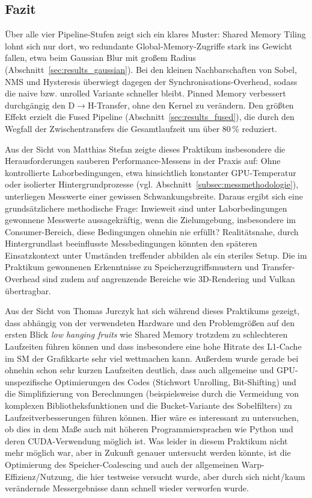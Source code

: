 \subsection{Fazit}
\label{subsec:fazit}

Über alle vier Pipeline-Stufen zeigt sich ein klares Muster: Shared Memory
Tiling lohnt sich nur dort, wo redundante Global-Memory-Zugriffe stark ins
Gewicht fallen, etwa beim Gaussian Blur mit großem Radius
(Abschnitt~\ref{sec:results_gaussian}). Bei den kleinen Nachbarschaften von
Sobel, NMS und Hysteresis überwiegt dagegen der Synchronisations-Overhead,
sodass die naive bzw. unrolled Variante schneller bleibt. Pinned Memory
verbessert durchgängig den D$\to$H-Transfer, ohne den Kernel zu verändern.
Den größten Effekt erzielt die Fused Pipeline
(Abschnitt~\ref{sec:results_fused}), die durch den Wegfall der
Zwischentransfers die Gesamtlaufzeit um über 80\,\% reduziert.

Aus der Sicht von Matthias Stefan zeigte dieses Praktikum insbesondere die
Herausforderungen sauberen Performance-Messens in der Praxis auf: Ohne
kontrollierte Laborbedingungen, etwa hinsichtlich konstanter GPU-Temperatur
oder isolierter Hintergrundprozesse (vgl.
Abschnitt~\ref{subsec:messmethodologie}), unterliegen Messwerte einer gewissen
Schwankungsbreite. Daraus ergibt sich eine grundsätzlichere methodische
Frage: Inwieweit sind unter Laborbedingungen gewonnene Messwerte
aussagekräftig, wenn die Zielumgebung, insbesondere im Consumer-Bereich,
diese Bedingungen ohnehin nie erfüllt? Realitätsnahe, durch
Hintergrundlast beeinflusste Messbedingungen könnten den späteren
Einsatzkontext unter Umständen treffender abbilden als ein steriles
Setup. Die im Praktikum gewonnenen Erkenntnisse zu Speicherzugriffsmustern
und Transfer-Overhead sind zudem auf angrenzende Bereiche wie
3D-Rendering und Vulkan übertragbar.

Aus der Sicht von Thomas Jurczyk hat sich während dieses Praktikums gezeigt, dass abhängig von der verwendeten Hardware und den Problemgrößen auf den ersten Blick \textit{low hanging fruits} wie Shared Memory trotzdem zu schlechteren Laufzeiten führen können und dass insbesondere eine hohe Hitrate des L1-Cache im SM der Grafikkarte sehr viel wettmachen kann. Außerdem wurde gerade bei ohnehin schon sehr kurzen Laufzeiten deutlich, dass auch allgemeine und GPU-unspezifische Optimierungen des Codes (Stichwort Unrolling, Bit-Shifting) und die Simplifizierung von Berechnungen (beispielsweise durch die Vermeidung von komplexen Bibliotheksfunktionen und die Bucket-Variante des Sobelfilters) zu Laufzeitverbesserungen führen können. Hier wäre es interessant zu untersuchen, ob dies in dem Maße auch mit höheren Programmiersprachen wie Python und deren CUDA-Verwendung möglich ist. Was leider in diesem Praktikum nicht mehr möglich war, aber in Zukunft genauer untersucht werden könnte, ist die Optimierung des Speicher-Coalescing und auch der allgemeinen Warp-Effizienz/Nutzung, die hier testweise versucht wurde, aber durch sich nicht/kaum verändernde Messergebnisse dann schnell wieder verworfen wurde.  

